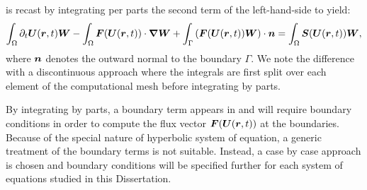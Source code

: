  is recast by integrating per parts the second term of the left-hand-side to yield:
\begin{align}
  \label{en:va_system_weak2}
  \int_\Omega \partial_t \boldsymbol U(\boldsymbol r, t)  \boldsymbol W -   \int_\Omega \boldsymbol F(\boldsymbol U(\boldsymbol r, t)) \cdot \boldsymbol{\nabla} \boldsymbol W 
+ \int_\Gamma \left( \boldsymbol F(\boldsymbol U(\boldsymbol r, t))  \boldsymbol W \right) \cdot \boldsymbol n   =  \int_{\Omega}  \boldsymbol S(\boldsymbol U(\boldsymbol r, t))  \boldsymbol W,
\end{align}
where $\boldsymbol n$ denotes the outward normal to the boundary $\Gamma$. We note the difference with a discontinuous approach where the integrals are first split over each element of the computational mesh before integrating by parts. 

By integrating by parts, a boundary term appears in  and will require boundary conditions in order to compute the flux  vector $\boldsymbol F(\boldsymbol U(\boldsymbol r, t))$ at the boundaries. Because of the special nature of hyperbolic system of equation, a generic treatment of the boundary terms is not suitable. Instead, a case by case approach is chosen and boundary conditions will be specified further for each system of equations studied in this Dissertation. 

